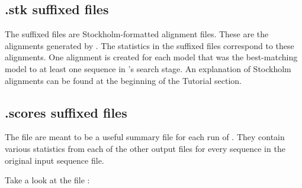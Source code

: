 \subsection{.stk suffixed files}
The  suffixed files are Stockholm-formatted alignment
files. These are the alignments generated by . The
statistics in the  suffixed files correspond to these
alignments. One alignment is created for each model that was the
best-matching model to at least one sequence in 's
search stage. An explanation of Stockholm alignments can be found at
the beginning of the Tutorial section.

\subsection{.scores suffixed files}

The  file are meant to be a useful summary file for each
run of . They contain various statistics from each of
the other output files for every sequence in the original input
sequence file. 

Take a look at the file :


